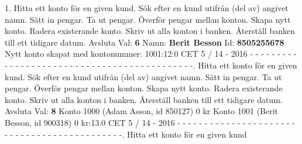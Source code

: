 1.   Hitta ett konto för en given kund.   Sök efter en kund utifrån (del av) angivet namn.   Sätt in pengar.   Ta ut pengar.   Överför pengar mellan konton.   Skapa nytt konto.   Radera existerande konto.   Skriv ut alla konton i banken.   Återställ banken till ett tidigare datum. Avsluta\newline
Val: \textbf{6}\newline
Namn: \textbf{Berit Besson}\newline
Id: \textbf{8505255678}\newline
Nytt konto skapat med kontonummer: 1001:12:0 CET 5 / 14 - 2016\newline
\newline
- - - - - - - - - - - - - - - - - - - - - - - - - - - - - - - - - - - - - - - - - - - -.   Hitta ett konto för en given kund.   Sök efter en kund utifrån (del av) angivet namn.   Sätt in pengar.   Ta ut pengar.   Överför pengar mellan konton.   Skapa nytt konto.   Radera existerande konto.   Skriv ut alla konton i banken.   Återställ banken till ett tidigare datum. Avsluta\newline
Val: \textbf{8}\newline
Konto 1000 (Adam Asson, id 850127) 0 kr\newline
Konto 1001 (Berit Besson, id 900318) 0 kr:13:0 CET 5 / 14 - 2016\newline
- - - - - - - - - - - - - - - - - - - - - - - - - - - - - - - - - - - - - - - - - - - -.   Hitta ett konto för en given kund\newline

